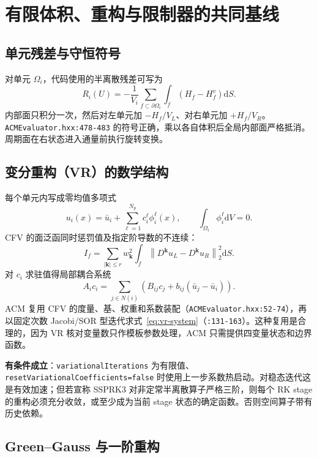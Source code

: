 \documentclass[UTF8,11pt,a4paper]{ctexart}
\newcommand{\statusconditional}{\textcolor{WarnOrange}{\textbf{有条件成立}}}
\newcommand{\code}[1]{\nolinkurl{#1}}
\newcommand{\dd}{\mathrm{d}}
\begin{document}
\section{有限体积、重构与限制器的共同基线}

\subsection{单元残差与守恒符号}

对单元 $\Omega_i$，代码使用的半离散残差可写为
\begin{equation}
 R_i(U)=-\frac{1}{V_i}\sum_{f\subset\partial\Omega_i}
 \int_f\left(H_f-H_f^v\right)\dd S.
 \label{eq:fv-residual}
\end{equation}
内部面只积分一次，然后对左单元加 $-H_f/V_L$、对右单元加 $+H_f/V_R$。\code{ACMEvaluator.hxx:478-483} 的符号正确，乘以各自体积后全局内部面严格抵消。周期面在右状态进入通量前执行旋转变换。

\subsection{变分重构（VR）的数学结构}

每个单元内写成零均值多项式
\begin{equation}
 u_i(x)=\bar u_i+\sum_{\ell=1}^{N_p}c_i^{\ell}\phi_i^{\ell}(x),
 \qquad \int_{\Omega_i}\phi_i^{\ell}\dd V=0.
\end{equation}
CFV 的面泛函同时惩罚值及指定阶导数的不连续：
\begin{equation}
 I_f=\sum_{|\bm k|\le r}w_{\bm k}^2
 \int_f\left\|D^{\bm k}u_L-D^{\bm k}u_R\right\|_2^2\dd S.
\end{equation}
对 $c_i$ 求驻值得局部耦合系统
\begin{equation}
 A_i c_i=\sum_{j\in N(i)}\left(B_{ij}c_j+b_{ij}(\bar u_j-\bar u_i)\right).
 \label{eq:vr-system}
\end{equation}
ACM 复用 CFV 的度量、基、权重和系数装配（\code{ACMEvaluator.hxx:52-74}），再以固定次数 Jacobi/SOR 型迭代求式~\eqref{eq:vr-system}（\code{:131-163}）。这种复用是合理的，因为 VR 核对变量数只作模板参数处理，ACM 只需提供四变量状态和边界函数。

\statusconditional：\code{variationalIterations} 为有限值、\code{resetVariationalCoefficients=false} 时使用上一步系数热启动。对稳态迭代这是有效加速；但若宣称 SSPRK3 对非定常半离散算子严格三阶，则每个 RK stage 的重构必须充分收敛，或至少成为当前 stage 状态的确定函数。否则空间算子带有历史依赖。

\subsection{Green--Gauss 与一阶重构}
\end{document}
